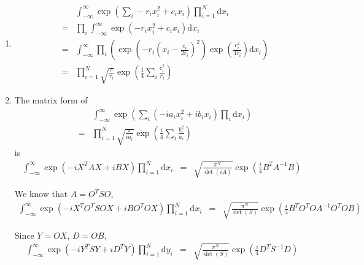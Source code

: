 \documentclass[12pt,a4paper]{article}
\begin{document}
\begin{enumerate}








\item
\begin{eqnarray*}
	&&\int_{-\infty}^\infty \exp\left(\sum_i - r_i x_i^2 + c_i x_i\right) \prod_{i=1}^N \mathrm dx_i \\
	&=& \prod_i \int_{-\infty}^\infty \exp\left( -r_ix_i^2 + c_i x_i \right)\mathrm dx_i \\
	&=& \int_{-\infty}^{\infty} \prod_i \left( \exp\left( -r_i (x_i - \frac{c_i}{2r_i})^2 \right)\exp\left( \frac{c_i^2}{4r_i} \right)\mathrm dx_i \right) \\
	&=& \prod _{i=1}^N \sqrt{\frac{\pi}{r_i}} \exp\left( \frac14 \sum_i \frac{c_i^2}{r_i} \right)
\end{eqnarray*}





\item

The matrix form of
\begin{eqnarray*}
	&&\int_{-\infty}^{\infty} \exp\left( \sum_i ( -i a_i x_i^2  + i b_i x_i  )\prod _i \mathrm d x_i \right) \\
	&=& \prod_{i=1}^N \sqrt{\frac{\pi}{ia_i}}\exp\left( \frac{i}{4} \sum_i \frac{b_i^2}{a_i} \right)
\end{eqnarray*}
is
\begin{eqnarray*}
	\int_{-\infty}^{\infty} \exp\left( -i X^T A X + i B X \right) \prod_{i=1}^N \mathrm dx_i &=& \sqrt{\frac{\pi^N}{\det(iA)}}  \exp\left( \frac{i}{4} B^T A^{-1}B \right)
\end{eqnarray*}

We know that $A = O^T S O$,
\begin{eqnarray*}
	\int_{-\infty}^\infty \exp\left( -i X^T O^T S O X + i B O^T O X \right)\prod_{i=1}^N \mathrm dx_i &=& \sqrt{\frac{\pi^N}{\det(S)}} \exp\left( \frac i 4  B^T O^T O A^{-1} O^T O B \right)
\end{eqnarray*}

Since $Y=OX$, $D=OB$,
\begin{eqnarray*}
	\int_{-\infty}^\infty \exp\left( -i Y^T S Y +  i D^T Y \right)\prod_{i=1}^N \mathrm dy_i &=& \sqrt{\frac{\pi^N}{\det(S)}} \exp\left( \frac i 4 D^T S^{-1} D \right) 
\end{eqnarray*}






\end{enumerate}
\end{document}
